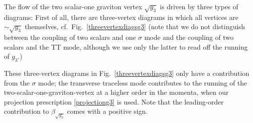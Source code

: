 \documentclass[11pt]{book} %
\newcommand{\bea}{\begin{eqnarray}}
\newcommand{\eea}{\end{eqnarray}}
\numberwithin{equation}{chapter}
\begin{document}
The flow of the two scalar-one graviton vertex
$\sqrt{g_3}$ is driven by three types of diagrams:
First of all, there are three-vertex diagrams in which all vertices are $\sim \sqrt{g_3}$ themselves,
cf.~Fig.~\ref{threevertexdiagsg3} (note that we do not distinguish between the coupling of two
scalars and one $\sigma$ mode and the coupling of two scalars and the TT mode,
although we use only the latter to read off the running of $g_3$.)

These three-vertex diagrams in Fig.~\ref{threevertexdiagsg3} only have a contribution from the $\sigma$ mode;
the transverse traceless mode contributes to the running of the two-scalar-one-graviton-vertex
at a higher order in the momenta, when our projection prescription
\eqref{projectiong3} is used.
Note that the leading-order contribution to $\beta_{\sqrt{g_3}}$ comes with a positive sign.


\end{document}
